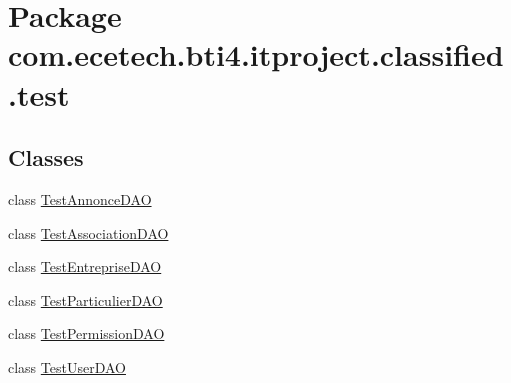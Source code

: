 \hypertarget{namespacecom_1_1ecetech_1_1bti4_1_1itproject_1_1classified_1_1test}{}\section{Package com.\+ecetech.\+bti4.\+itproject.\+classified.\+test}
\label{namespacecom_1_1ecetech_1_1bti4_1_1itproject_1_1classified_1_1test}
\subsection*{Classes}
\begin{DoxyCompactItemize}
\item 
class \hyperlink{classcom_1_1ecetech_1_1bti4_1_1itproject_1_1classified_1_1test_1_1_test_annonce_d_a_o}{Test\+Annonce\+D\+AO}
\item 
class \hyperlink{classcom_1_1ecetech_1_1bti4_1_1itproject_1_1classified_1_1test_1_1_test_association_d_a_o}{Test\+Association\+D\+AO}
\item 
class \hyperlink{classcom_1_1ecetech_1_1bti4_1_1itproject_1_1classified_1_1test_1_1_test_entreprise_d_a_o}{Test\+Entreprise\+D\+AO}
\item 
class \hyperlink{classcom_1_1ecetech_1_1bti4_1_1itproject_1_1classified_1_1test_1_1_test_particulier_d_a_o}{Test\+Particulier\+D\+AO}
\item 
class \hyperlink{classcom_1_1ecetech_1_1bti4_1_1itproject_1_1classified_1_1test_1_1_test_permission_d_a_o}{Test\+Permission\+D\+AO}
\item 
class \hyperlink{classcom_1_1ecetech_1_1bti4_1_1itproject_1_1classified_1_1test_1_1_test_user_d_a_o}{Test\+User\+D\+AO}
\end{DoxyCompactItemize}
